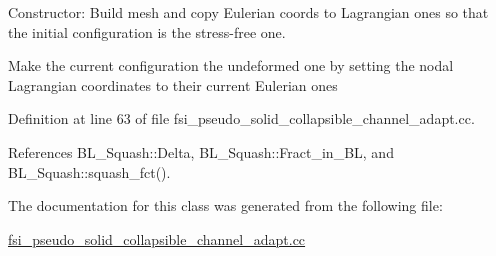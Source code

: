 Constructor\+: Build mesh and copy Eulerian coords to Lagrangian ones so that the initial configuration is the stress-\/free one. 

Make the current configuration the undeformed one by setting the nodal Lagrangian coordinates to their current Eulerian ones 

Definition at line 63 of file fsi\+\_\+pseudo\+\_\+solid\+\_\+collapsible\+\_\+channel\+\_\+adapt.\+cc.



References B\+L\+\_\+\+Squash\+::\+Delta, B\+L\+\_\+\+Squash\+::\+Fract\+\_\+in\+\_\+\+BL, and B\+L\+\_\+\+Squash\+::squash\+\_\+fct().



The documentation for this class was generated from the following file\+:\begin{DoxyCompactItemize}
\item 
\hyperlink{fsi__pseudo__solid__collapsible__channel__adapt_8cc}{fsi\+\_\+pseudo\+\_\+solid\+\_\+collapsible\+\_\+channel\+\_\+adapt.\+cc}\end{DoxyCompactItemize}
